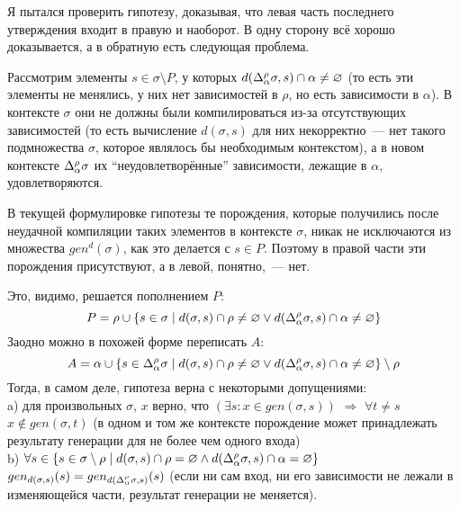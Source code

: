 





\hrulefill

Я пытался проверить гипотезу, доказывая, что левая часть последнего утверждения входит в правую и наоборот. В одну сторону всё хорошо доказывается, а в обратную есть следующая проблема.

Рассмотрим элементы $s \in \sigma \setminus P$, у которых $d(\Delta_\alpha^\rho\sigma, s) \cap \alpha \neq \varnothing$ (то есть эти элементы не менялись, у них нет зависимостей в $\rho$, но есть зависимости в $\alpha$). В контексте $\sigma$ они не должны были компилироваться из-за отсутствующих зависимостей (то есть вычисление $d(\sigma, s)$ для них некорректно~--- нет такого подмножества $\sigma$, которое являлось бы необходимым контекстом), а в новом контексте $\Delta_\alpha^\rho\sigma$ их ``неудовлетворённые'' зависимости, лежащие в $\alpha$, удовлетворяются.

В текущей формулировке гипотезы те порождения, которые получились после неудачной компиляции таких элементов в контексте $\sigma$, никак не исключаются из множества $gen^d(\sigma)$, как это делается с $s \in P$. Поэтому в правой части эти порождения присутствуют, а в левой, понятно,~--- нет.

Это, видимо, решается пополнением $P$:
$$P = \rho \cup \{ s \in \sigma \mid d(\sigma, s) \cap \rho \neq \varnothing \vee d(\Delta_\alpha^\rho\sigma, s) \cap \alpha \neq \varnothing \}$$
Заодно можно в похожей форме переписать $A$:
$$A = \alpha \cup \{ s \in \Delta_\alpha^\rho\sigma \mid d(\sigma, s) \cap \rho \neq \varnothing \vee d(\Delta_\alpha^\rho\sigma, s) \cap \alpha \neq \varnothing \} \setminus \rho$$
Тогда, в самом деле, гипотеза верна с некоторыми допущениями:\\
\indent a) для произвольных $\sigma$, $x$ верно, что $(\exists s: x \in gen(\sigma, s))$ $\Rightarrow$ $\forall t \neq s$ $x \notin gen(\sigma, t)$ (в одном и том же контексте порождение может принадлежать результату генерации для не более чем одного входа)\\
\indent b) $\forall s \in \{s \in \sigma \setminus \rho \mid d(\sigma, s) \cap \rho = \varnothing \wedge d(\Delta_\alpha^\rho\sigma, s) \cap \alpha = \varnothing \}$ $gen_{d(\sigma, s)} (s) = gen_{d(\Delta_\alpha^\rho\sigma, s)} (s)$ (если ни сам вход, ни его зависимости не лежали в изменяющейся части, результат генерации не меняется).\\

